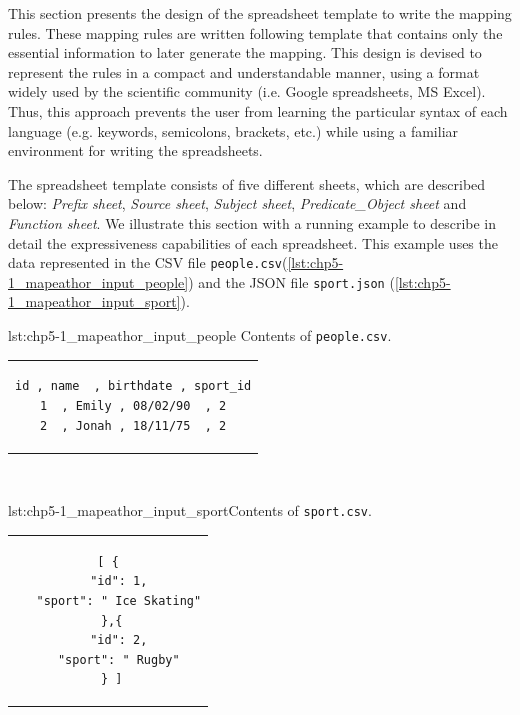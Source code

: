 
This section presents the design of the spreadsheet template to write the mapping rules. 
These mapping rules are written following template that contains only the essential information to later generate the mapping. 
This design is devised to represent the rules in a compact and understandable manner, using a format widely used by the scientific community (i.e. Google spreadsheets, MS Excel).
Thus, this approach prevents the user from learning the particular syntax of each language (e.g. keywords, semicolons, brackets, etc.) while using a familiar environment for writing the spreadsheets. 

The spreadsheet template consists of five different sheets, which are described below: \textit{Prefix sheet}, \textit{Source sheet}, \textit{Subject sheet}, \textit{Predicate\_Object sheet} and \textit{Function sheet}. We illustrate this section with a running example to describe in detail the expressiveness capabilities of each spreadsheet. This example uses the data represented in the CSV file \texttt{people.csv}(\cref{lst:chp5-1_mapeathor_input_people}) and the JSON file \texttt{sport.json} (\cref{lst:chp5-1_mapeathor_input_sport}).

\begin{minipage}{0.48\linewidth}
\begin{captionedlisting}{lst:chp5-1_mapeathor_input_people}{ Contents of \texttt{people.csv}.}
\centering
\begin{tabular}{c}
{
\begin{lstlisting}[basicstyle=\ttfamily\small,label={list:example1},columns=flexible]
id , name  , birthdate , sport_id
1  , Emily , 08/02/90  , 2
2  , Jonah , 18/11/75  , 2
\end{lstlisting}
}
\end{tabular}
\end{captionedlisting}
\end{minipage}
\,\,\,\,\hfill
\begin{minipage}{0.52\linewidth}
\begin{captionedlisting}{lst:chp5-1_mapeathor_input_sport}{Contents of \texttt{sport.csv}.}
\centering
\begin{tabular}{c}
\hspace{1.5em}
{
\begin{lstlisting}[basicstyle=\ttfamily\small,label={list:example1},columns=flexible]
[ {
   "id": 1,
   "sport": " Ice Skating"
 },{
   "id": 2,
   "sport": " Rugby"
 } ]
\end{lstlisting}
}
\end{tabular}
\end{captionedlisting}
\end{minipage}


